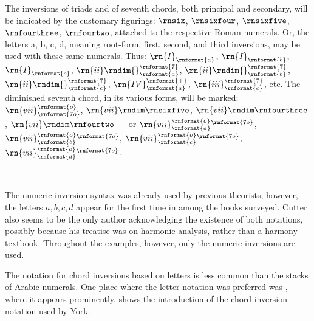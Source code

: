 \begin{italicquotes}
    The inversions of triads and of seventh chords, both
    principal and secondary, will be indicated by the
    customary figurings: $\rnsix$, $\rnsixfour$,
    $\rnsixfive$, $\rnfourthree$, $\rnfourtwo$, attached to
    the respective Roman numerals. Or, the letters a, b, c,
    d, meaning root-form, first, second, and third
    inversions, may be used with these same numerals. Thus:
    $\rn{I}_\rnformat{a}$, $\rn{I}_\rnformat{b}$,
    $\rn{I}_\rnformat{c}$,
    $\rn{ii}\rndim{}^\rnformat{7}_\rnformat{a}$,
    $\rn{ii}\rndim{}^\rnformat{7}_\rnformat{b}$,
    $\rn{ii}\rndim{}^\rnformat{7}_\rnformat{c}$,
    $\rn{IV}^\rnformat{+}_\rnformat{a}$,
    $\rn{iii}^\rnformat{7}_\rnformat{c}$, etc. The
    diminished seventh chord, in its various forms, will be
    marked: $\rn{vii}^\rnformat{o}_\rnformat{7o}$,
    $\rn{vii}\rndim\rnsixfive$,
    $\rn{vii}\rndim\rnfourthree$, $\rn{vii}\rndim\rnfourtwo$
    --- or $\rn{vii}^{\rnformat{o}}_{\rnformat{a}}{}^\rnformat{7o}$,
    $\rn{vii}^{\rnformat{o}}_{\rnformat{b}}{}^\rnformat{7o}$,
    $\rn{vii}^{\rnformat{o}}_{\rnformat{c}}{}^\rnformat{7o}$,
    $\rn{vii}^{\rnformat{o}}_{\rnformat{d}}{}^\rnformat{7o}$.

    --- \emph{\textcite[p.~4]{cutter1902harmonic}}
\end{italicquotes}

The numeric inversion syntax was already used by previous
theorists, however, the letters ${a, b, c , d}$ appear for
the first time in \textcite{cutter1902harmonic} among the
books surveyed. Cutter also seems to be the only author
acknowledging the existence of both notations, possibly
because his treatise was on harmonic analysis, rather than a
harmony textbook. Throughout the examples, however, only the
numeric inversions are used.



The notation for chord inversions based on letters is less
common than the stacks of Arabic numerals. One place where
the letter notation was preferred was
\textcite{york1909practical}, where it appears prominently.
 shows the
introduction of the chord inversion notation used by York.

